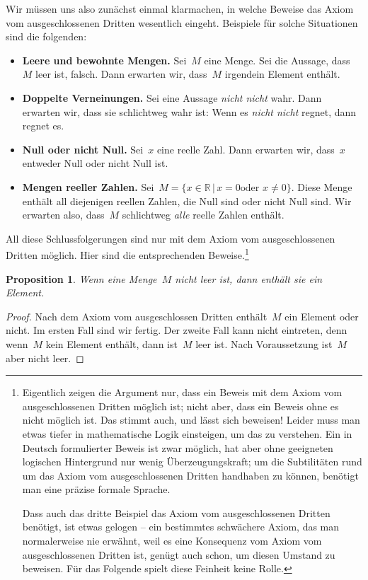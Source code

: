 \documentclass[twoside]{../zirkelblatt}
\newcommand{\RR}{\mathbb{R}}
\theoremstyle{definition}
\theoremstyle{plain}
\newtheorem{prop}[defn]{Proposition}
\theoremstyle{remark}
\begin{document}
Wir müssen uns also zunächst einmal klarmachen, in welche Beweise das Axiom vom
ausgeschlossenen Dritten wesentlich eingeht. Beispiele für solche
Situationen sind die folgenden:

\begin{itemize}
\item \textbf{Leere und bewohnte Mengen.} Sei~$M$ eine Menge. Sei die Aussage,
dass~$M$ leer ist, falsch. Dann erwarten wir, dass~$M$ irgendein Element
enthält.
\item \textbf{Doppelte Verneinungen.} Sei eine Aussage \emph{nicht nicht} wahr.
Dann erwarten wir, dass sie schlichtweg wahr ist: Wenn es \emph{nicht nicht}
regnet, dann regnet es.
\item \textbf{Null oder nicht Null.} Sei~$x$ eine reelle Zahl. Dann erwarten wir,
dass~$x$ entweder Null oder nicht Null ist.
\item \textbf{Mengen reeller Zahlen.} Sei~$M = \{ x \in \RR \,|\, \text{$x = 0$
oder $x \neq 0$} \}$. Diese Menge enthält all diejenigen reellen Zahlen, die Null sind
oder nicht Null sind. Wir erwarten also, dass~$M$ schlichtweg \emph{alle}
reelle Zahlen enthält.
\end{itemize}

All diese Schlussfolgerungen sind nur mit dem Axiom vom ausgeschlossenen
Dritten möglich. Hier sind die entsprechenden Beweise.\footnote{Eigentlich
zeigen die Argument nur, dass ein Beweis mit dem
Axiom vom ausgeschlossenen Dritten möglich ist; nicht aber, dass ein Beweis
ohne es nicht möglich ist. Das stimmt auch, und lässt sich beweisen!
Leider muss man etwas tiefer in mathematische Logik einsteigen, um das zu
verstehen. Ein in Deutsch formulierter Beweis ist zwar möglich, hat aber ohne
geeigneten logischen Hintergrund nur wenig Überzeugungskraft; um die
Subtilitäten rund um das Axiom vom ausgeschlossenen Dritten handhaben zu
können, benötigt man eine präzise formale Sprache.

Dass auch das dritte Beispiel das Axiom vom ausgeschlossenen Dritten benötigt,
ist etwas gelogen -- ein bestimmtes schwächere Axiom, das man normalerweise nie
erwähnt, weil es eine Konsequenz vom Axiom vom ausgeschlossenen Dritten ist,
genügt auch schon, um diesen Umstand zu beweisen. Für das Folgende spielt diese
Feinheit keine Rolle.}
\begin{prop}Wenn eine Menge~$M$ nicht leer ist, dann enthält sie ein Element.
\end{prop}
\begin{proof}
Nach dem Axiom vom ausgeschlossen Dritten enthält~$M$ ein Element oder nicht.
Im ersten Fall sind wir fertig. Der zweite Fall kann nicht eintreten, denn
wenn~$M$ kein Element enthält, dann ist~$M$ leer ist. Nach Voraussetzung
ist~$M$ aber nicht leer.
\end{proof}
\end{document}
